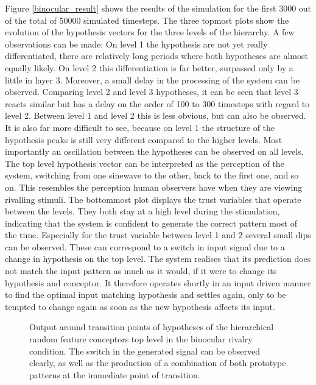\documentclass{frontiersSCNS} %
\begin{document}
	Figure \ref{binocular_result} shows the results of the simulation for the first 3000 out of the total of 50000 simulated timesteps. The three topmost plots show the evolution of the hypothesis vectors for the three levels of the hierarchy. A few observations can be made: On level 1 the hypothesis are not yet really differentiated, there are relatively long periods where both hypotheses are almost equally likely. On level 2 this differentiation is far better, surpassed only by a little in layer 3. Moreover, a small delay in the processing of the system can be observed. Comparing level 2 and level 3 hypotheses, it can be seen that level 3 reacts similar but has a delay on the order of 100 to 300 timesteps with regard to level 2. Between level 1 and level 2 this is less obvious, but can also be observed. It is also far more difficult to see, because on level 1 the structure of the hypothesis peaks is still very different compared to the higher levels. Most importantly an oscillation between the hypotheses can be observed on all levels. The top level hypothesis vector can be interpreted as the perception of the system, switching from one sinewave to the other, back to the first one, and so on. This resembles the perception human observers have when they are viewing rivalling stimuli.  
	The bottommost plot displays the trust variables that operate between the levels. They both stay at a high level during the stimulation, indicating that the system is confident to generate the correct pattern most of the time. Especially for the trust variable between level 1 and 2 several small dips can be observed. These can correspond to a switch in input signal due to a change in hypothesis on the top level. The system realises that its prediction does not match the input pattern as much as it would, if it were to change its hypothesis and conceptor. It therefore operates shortly in an input driven manner to find the optimal input matching hypothesis and settles again, only to be tempted to change again as soon as the new hypothesis affects its input.  

    \begin{figure}
           	\centering
       	    

      	\caption[Output of the HRFC in the binocular rivalry condition]{Output around transition points of hypotheses of the hierarchical random feature conceptors top level in the binocular rivalry condition. The switch in the generated signal can be observed clearly, as well as the production of a combination of both prototype patterns at the immediate point of transition. }
        \label{predictions}
    \end{figure}
\end{document}
